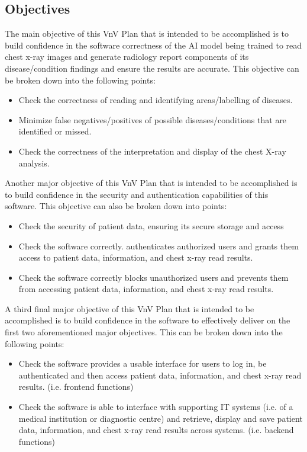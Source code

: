 \documentclass[12pt, titlepage]{article}
\begin{document}
\subsection{Objectives}
The main objective of this VnV Plan that is intended to be accomplished is to build confidence in the software correctness of the AI model being trained to read chest x-ray images and generate radiology report components of its disease/condition findings and ensure the results are accurate. This objective can be broken down into the following points:
\begin{itemize}
    \item Check the correctness of reading and identifying areas/labelling of diseases.
    \item Minimize false negatives/positives of possible diseases/conditions that are identified or missed.
    \item Check the correctness of the interpretation and display of the chest X-ray analysis.
\end{itemize}

\noindent Another major objective of this VnV Plan that is intended to be accomplished is to build confidence in the security and authentication capabilities of this software. This objective can also be broken down into points:
\begin{itemize}
    \item Check the security of patient data, ensuring its secure storage and access
    \item Check the software correctly. authenticates authorized users and grants them access to patient data, information, and chest x-ray read results.
    \item Check the software correctly blocks unauthorized users and prevents them from accessing patient data, information, and chest x-ray read results.
\end{itemize}

\noindent A third final major objective of this VnV Plan that is intended to be accomplished is to build confidence in the software to effectively deliver on the first two aforementioned major objectives. This can be broken down into the following points:
\begin{itemize}
    \item Check the software provides a usable interface for users to log in, be authenticated and then access patient data, information, and chest x-ray read results. (i.e. frontend functions)
    \item Check the software is able to interface with supporting IT systems (i.e. of a medical institution or diagnostic centre) and retrieve, display and save patient data, information, and chest x-ray read results across systems. (i.e. backend functions)
\end{itemize}
\end{document}
